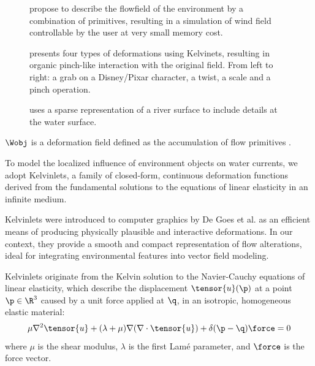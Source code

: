 \begin{figure}
    \caption{\cite{Wejchert1991} propose to describe the flowfield of the environment by a combination of primitives, resulting in a simulation of wind field controllable by the user at very small memory cost. }
    \label{fig:env-obj_wejchert-flow}
\end{figure}

\begin{figure}
    \caption{\cite{DeGoes2017} presents four types of deformations using Kelvinets, resulting in organic pinch-like interaction with the original field. From left to right: a grab on a \textcopyright Disney/Pixar character, a twist, a scale and a pinch operation. }
    \label{fig:env-obj_kelvinlets-demo}
\end{figure}

\begin{figure}
    \caption{\cite{Peytavie2019} uses a sparse representation of a river surface to include details at the water surface.}
    \label{fig:env-obj_peytavie-river-primitives}
\end{figure}

$\Wobj$ is a deformation field defined as the accumulation of flow primitives \cite{Wejchert1991}. %


To model the localized influence of environment objects on water currents, we adopt Kelvinlets, a family of closed-form, continuous deformation functions derived from the fundamental solutions to the equations of linear elasticity in an infinite medium.

Kelvinlets were introduced to computer graphics by De Goes et al. \cite{DeGoes2017} as an efficient means of producing physically plausible and interactive deformations. In our context, they provide a smooth and compact representation of flow alterations, ideal for integrating environmental features into vector field modeling.

Kelvinlets originate from the Kelvin solution to the Navier-Cauchy equations of linear elasticity, which describe the displacement $\tensor{u}(\p)$ at a point $\p \in \R^3$ caused by a unit force applied at $\q$, in an isotropic, homogeneous elastic material:
\begin{align}
    \mu \nabla^2 \tensor{u} + (\lambda + \mu) \nabla(\nabla \cdot \tensor{u}) + \delta(\p - \q) \force = 0
\end{align}
where $\mu$ is the shear modulus, $\lambda$ is the first Lamé parameter, and $\force$ is the force vector.

